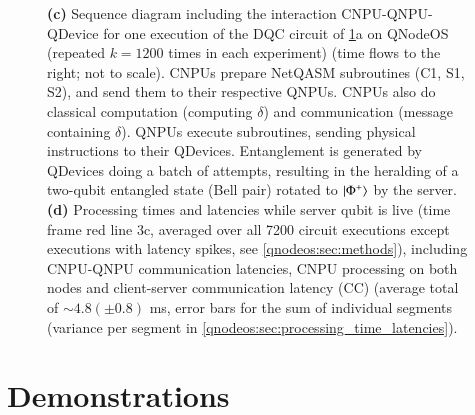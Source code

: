 \begin{figure}[t]
{\textbf{(c)} Sequence diagram including the interaction CNPU-QNPU-QDevice for one execution of the DQC circuit of \cref{qnodeos:fig:fig3}a on QNodeOS (repeated $k=1200$ times in each experiment) (time flows to the right; not to scale). CNPUs prepare NetQASM subroutines (C1, S1, S2), and send them to their respective QNPUs. CNPUs also do classical computation (computing $\delta$) and communication (message containing $\delta$). QNPUs execute subroutines, sending physical instructions to their QDevices. Entanglement is generated by QDevices doing a batch of attempts, resulting in the heralding of a two-qubit entangled state (Bell pair) rotated to $\ket{\Phi^+}$ by the server.
\textbf{(d)} Processing times and latencies while server qubit is live (time frame red line 3c, averaged over all 7200 circuit executions except executions with latency spikes, see \cref{qnodeos:sec:methods}), including CNPU-QNPU communication latencies, CNPU processing on both nodes and client-server communication latency (CC) (average total of $\sim 4.8 (\pm 0.8)$ ms, error bars for the sum of individual segments (variance per segment in \cref{qnodeos:sec:processing_time_latencies}).}
\label{qnodeos:fig:fig3}
\end{figure}


\section{Demonstrations}

